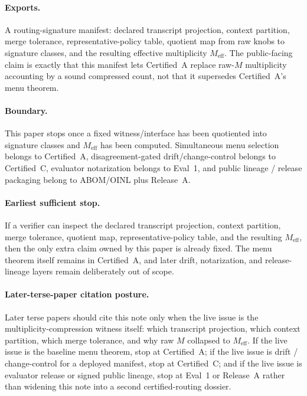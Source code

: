 \documentclass[11pt]{article}
\begin{document}
\paragraph{Exports.}
A routing-signature manifest: declared transcript projection, context partition, merge tolerance, representative-policy table, quotient map from raw knobs to signature classes, and the resulting effective multiplicity $M_{\mathrm{eff}}$. The public-facing claim is exactly that this manifest lets Certified~A replace raw-$M$ multiplicity accounting by a sound compressed count, not that it supersedes Certified~A's menu theorem.

\paragraph{Boundary.}
This paper stops once a fixed witness/interface has been quotiented into signature classes and $M_{\mathrm{eff}}$ has been computed.
Simultaneous menu selection belongs to Certified~A, disagreement-gated drift/change-control belongs to Certified~C, evaluator notarization belongs to Eval~1, and public lineage / release packaging belong to ABOM/OINL plus Release~A.\cite{series:certifiedmenus,series:recert,series:eval1,series:releaseA}

\paragraph{Earliest sufficient stop.}
If a verifier can inspect the declared transcript projection, context partition, merge tolerance, quotient map, representative-policy table, and the resulting $M_{\mathrm{eff}}$, then the only extra claim owned by this paper is already fixed. The menu theorem itself remains in Certified~A, and later drift, notarization, and release-lineage layers remain deliberately out of scope.

\paragraph{Later-terse-paper citation posture.}
Later terse papers should cite this note only when the live issue is the multiplicity-compression witness itself: which transcript projection, which context partition, which merge tolerance, and why raw $M$ collapsed to $M_{\mathrm{eff}}$. If the live issue is the baseline menu theorem, stop at Certified~A; if the live issue is drift / change-control for a deployed manifest, stop at Certified~C; and if the live issue is evaluator release or signed public lineage, stop at Eval~1 or Release~A rather than widening this note into a second certified-routing dossier.\cite{series:certifiedmenus,series:recert,series:eval1,series:releaseA}
\end{document}
